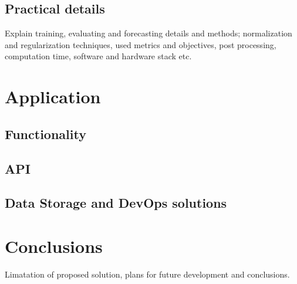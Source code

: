 \documentclass{article}
\begin{document}
	\subsection{Practical details}
	Explain training, evaluating and forecasting details and methods;
	normalization and regularization techniques, used metrics and objectives, post processing, computation time, software and hardware stack etc.
	
    \section{Application}
	
    \subsection{Functionality}
	\subsection{API}
	\subsection{Data Storage and DevOps solutions}
	
	\section{Conclusions}
	Limatation of proposed solution, plans for future development and conclusions.
	
\end{document}
